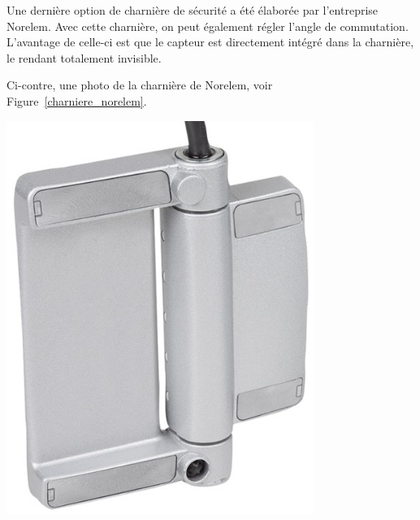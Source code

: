 \begin{minipage}[c]{0.6\textwidth}
    Une dernière option de charnière de sécurité a été élaborée par l'entreprise Norelem. Avec cette charnière, on peut également régler l'angle de commutation. L'avantage de celle-ci est que le capteur est directement intégré dans la charnière, le rendant totalement invisible.

    Ci-contre, une photo de la charnière de Norelem, voir Figure~\ref{charniere_norelem}.
\end{minipage}\hfill
\begin{minipage}[c]{0.35\textwidth}
    \begin{center}
        \includegraphics[width=0.75\textwidth]{assets/figures/Protections_laser/Securite_electrique/charniere_norelem.jpeg}
    \end{center}
    \label{charniere_norelem}
\end{minipage}

